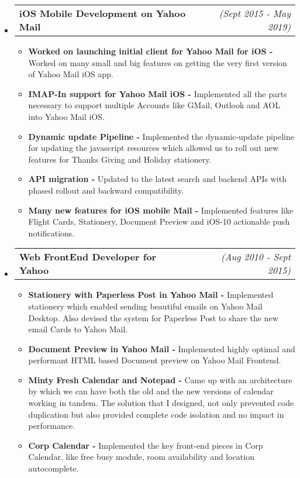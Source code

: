 \documentclass[a4paper,11pt,times]{res}
\makeatletter
\newcommand{\smalitem}[1]{\item #1 \vspace{-4pt}}
\newcommand{\mysubheading}[2]{
\begin{tabular*}{172mm}{l@{\extracolsep{\fill}}r}
		\textbf{#1} & \textit{#2} \\
\end{tabular*}\vspace{-1pt}}
\makeatother
\begin{document}
\begin{itemize}
\item
\mysubheading{iOS Mobile Development on Yahoo Mail }{(Sept 2015 - May 2019)}
\begin{itemize}
\vspace{-2pt}
\smalitem{\textbf{Worked on launching initial client for Yahoo Mail for iOS -} Worked on many small and big features on getting the very first version of Yahoo Mail iOS app.}
\smalitem{\textbf{IMAP-In support for Yahoo Mail iOS -} Implemented all the parts necessary to support multiple Accounts like GMail, Outlook and AOL into Yahoo Mail iOS.}
\smalitem{\textbf{Dynamic update Pipeline -} Implemented the dynamic-update pipeline for updating the javascript resources which allowed us to roll out new features for Thanks Giving and Holiday stationery.}
\smalitem{\textbf{API migration -} Updated to the latest search and backend APIs with phased rollout and backward compatibility.}
\smalitem{\textbf{Many new features for iOS mobile Mail -} Implemented features like Flight Cards, Stationery, Document Preview and iOS-10 actionable push notifications.}

\end{itemize}

\vspace{2pt}

\item
\mysubheading{Web FrontEnd Developer for Yahoo }{(Aug 2010 - Sept 2015)}
\begin{itemize}
\vspace{-2pt}
\smalitem{\textbf{Stationery with Paperless Post in Yahoo Mail -} Implemented stationery which enabled sending beautiful emails on Yahoo Mail Desktop. Also devised the system for Paperless Post to share the new email Cards to Yahoo Mail.}
\smalitem{\textbf{Document Preview in Yahoo Mail -} Implemented highly optimal and performant HTML based Document preview on Yahoo Mail Frontend.}
\smalitem{\textbf{Minty Fresh Calendar and Notepad -} Came up with an architecture by which we can have both the old and the new versions of calendar working in tandem. The solution that I designed, not only prevented code duplication but also provided complete code isolation and no impact in performance.}
\smalitem{\textbf{Corp Calendar -} Implemented the key front-end pieces in Corp Calendar, like free busy module, room availability and location autocomplete.}
\end{itemize}

\end{itemize}
\end{document}
